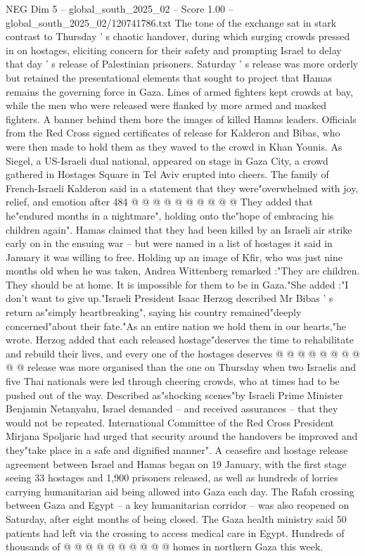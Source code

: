 \begin{textsample}{NEG Dim 5 – global\_south\_2025\_02 – Score 1.00 – global\_south\_2025\_02/120741786.txt}  \label{ex:f5_neg_306}
The tone of the exchange sat in stark contrast to Thursday ' s chaotic handover, during which surging crowds pressed in on hostages, eliciting concern for their safety and prompting Israel to delay that day ' s release of Palestinian prisoners.
Saturday ' s release was more orderly but retained the presentational elements that sought to project that Hamas remains the governing force in Gaza.
Lines of armed fighters kept crowds at bay, while the men who were released were flanked by more armed and masked fighters.
A banner behind them bore the images of killed Hamas leaders.
Officials from the Red Cross signed certificates of release for Kalderon and Bibas, who were then made to hold them as they waved to the crowd in Khan Younis.
As Siegel, a US-Israeli dual national, appeared on stage in Gaza City, a crowd gathered in Hostages Square in Tel Aviv erupted into cheers.
The family of French-Israeli Kalderon said in a statement that they were"overwhelmed with joy, relief, and emotion after 484 @ @ @ @ @ @ @ @ @ @ They added that he"endured months in a nightmare", holding onto the"hope of embracing his children again".
Hamas claimed that they had been killed by an Israeli air strike early on in the ensuing war -- but were named in a list of hostages it said in January it was willing to free.
Holding up an image of Kfir, who was just nine months old when he was taken, Andrea Wittenberg remarked :"They are children.
They should be at home.
It is impossible for them to be in Gaza."She added :"I don't want to give up."Israeli President Isaac Herzog described Mr Bibas ' s return as"simply heartbreaking", saying his country remained"deeply concerned"about their fate."As an entire nation we hold them in our hearts,"he wrote.
Herzog added that each released hostage"deserves the time to rehabilitate and rebuild their lives, and every one of the hostages deserves @ @ @ @ @ @ @ @ @ @ release was more organised than the one on Thursday when two Israelis and five Thai nationals were led through cheering crowds, who at times had to be pushed out of the way.
Described as"shocking scenes"by Israeli Prime Minister Benjamin Netanyahu, Israel demanded -- and received assurances -- that they would not be repeated.
International Committee of the Red Cross President Mirjana Spoljaric had urged that security around the handovers be improved and they"take place in a safe and dignified manner".
A ceasefire and hostage release agreement between Israel and Hamas began on 19 January, with the first stage seeing 33 hostages and 1,900 prisoners released, as well as hundreds of lorries carrying humanitarian aid being allowed into Gaza each day.
The Rafah crossing between Gaza and Egypt -- a key humanitarian corridor -- was also reopened on Saturday, after eight months of being closed.
The Gaza health ministry said 50 patients had left via the crossing to access medical care in Egypt.
Hundreds of thousands of @ @ @ @ @ @ @ @ @ @ homes in northern Gaza this week.

\end{textsample}
